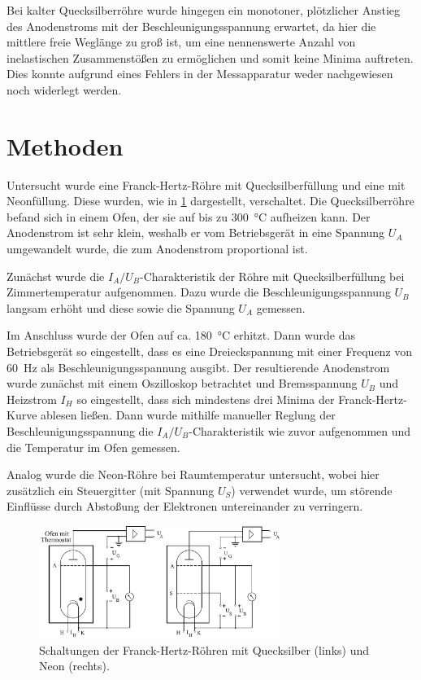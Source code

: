 \documentclass[
	a4paper,
	12pt,
	pagesize,
	ngerman
]{scrartcl}
\begin{document}
	Bei kalter Quecksilberröhre wurde hingegen ein monotoner, plötzlicher Anstieg des Anodenstroms mit der Beschleunigungsspannung erwartet, da hier die mittlere freie Weglänge zu groß ist, um eine nennenswerte Anzahl von inelastischen Zusammenstößen zu ermöglichen und somit keine Minima auftreten.
	Dies konnte aufgrund eines Fehlers in der Messapparatur weder nachgewiesen noch widerlegt werden.
	
	\section{Methoden}
	Untersucht wurde eine Franck-Hertz-Röhre mit Quecksilberfüllung und eine mit Neonfüllung.
	Diese wurden, wie in  \cref{Roehren_Schaltung} dargestellt, verschaltet. %
	Die Quecksilberröhre befand sich in einem Ofen, der sie auf bis zu \SI{300}{\degreeCelsius} aufheizen kann.
	Der Anodenstrom ist sehr klein, weshalb er vom Betriebsgerät in eine Spannung $U_A$ umgewandelt wurde, die zum Anodenstrom proportional ist.
	
	Zunächst wurde die $I_A/U_B$-Charakteristik der Röhre mit Quecksilberfüllung bei Zimmertemperatur aufgenommen.
	Dazu wurde die Beschleunigungsspannung $U_B$ langsam erhöht und diese sowie die Spannung $U_A$ gemessen.
	
	Im Anschluss wurde der Ofen auf ca. \SI{180}{\degreeCelsius} erhitzt.
	Dann wurde das Betriebsgerät so eingestellt, dass es eine Dreieckspannung mit einer Frequenz von \SI{60}{\hertz} als Beschleunigungsspannung ausgibt.
	Der resultierende Anodenstrom wurde zunächst mit einem Oszilloskop betrachtet und Bremsspannung $U_B$ und Heizstrom $I_H$ so eingestellt, dass sich mindestens drei Minima der Franck-Hertz-Kurve ablesen ließen.
	Dann wurde mithilfe manueller Reglung der Beschleunigungsspannung die $I_A/U_B$-Charakteristik wie zuvor aufgenommen und die Temperatur im Ofen gemessen.
	
	Analog wurde die Neon-Röhre bei Raumtemperatur untersucht, wobei hier zusätzlich ein Steuergitter (mit Spannung $U_S$) verwendet wurde, um störende Einflüsse durch Abstoßung der Elektronen untereinander zu verringern. %
	\begin{figure}[H]
		\includegraphics[width=0.7\textwidth]{Roehren}
		\centering
		\caption{Schaltungen der Franck-Hertz-Röhren mit Quecksilber (links) und Neon (rechts).\cite{Roehren} }
		\label{Roehren_Schaltung}
		\centering
	\end{figure}
\end{document}
